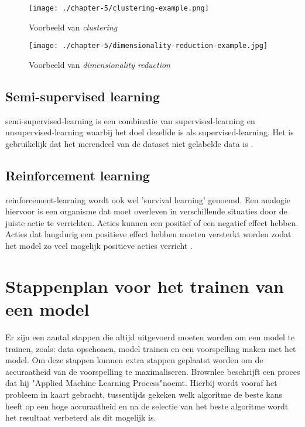 \begin{figure}[hbt!]
    \centering
    \begin{minipage}{0.3\textwidth}
        \centering
        \texttt{[image: ./chapter-5/clustering-example.png]}
        \caption{Voorbeeld van \textit{clustering}}
        \label{fig:clustering-example}
    \end{minipage}\hfill
    \begin{minipage}{0.6\textwidth}
        \centering
        \texttt{[image: ./chapter-5/dimensionality-reduction-example.jpg]}
        \caption{Voorbeeld van \textit{dimensionality reduction}}
        \label{fig:dimensionality-reduction-example}
    \end{minipage}
\end{figure}

\subsection{Semi-supervised learning}\label{subsec:semi-supervised-learning}
\Gls{semi-supervised-learning} is een combinatie van \gls{supervised-learning} en \gls{unsupervised-learning} waarbij het doel dezelfde is als \gls{supervised-learning}. Het is gebruikelijk dat het merendeel van de dataset niet gelabelde data is \cite{the-hundred-page-machine-learning-book}.

\subsection{Reinforcement learning}\label{subsec:reinforcement-learning}
\Gls{reinforcement-learning} wordt ook wel 'survival learning' genoemd. Een analogie hiervoor is een organisme dat moet overleven in verschillende situaties door de juiste actie te verrichten. Acties kunnen een positief of een negatief effect hebben. Acties dat langdurig een positieve effect hebben moeten versterkt worden zodat het model zo veel mogelijk positieve acties verricht \cite{bayesian-reasoning-and-machine-learning-book}.

\section{Stappenplan voor het trainen van een model}\label{sec:stappenplan-voor-het-trainen-van-een-model}
Er zijn een aantal stappen die altijd uitgevoerd moeten worden om een model te trainen, zoals: data opschonen, model trainen en een voorspelling maken met het model. Om deze stappen kunnen extra stappen geplaatst worden om de accuraatheid van de voorspelling te maximaliseren. Brownlee \cite{ml-applied-ml-process-brownlee} beschrijft een proces dat hij "Applied Machine Learning Process"\space noemt. Hierbij wordt vooraf het probleem in kaart gebracht, tussentijds gekeken welk algoritme de beste kans heeft op een hoge accuraatheid en na de selectie van het beste algoritme wordt het resultaat verbeterd als dit mogelijk is.

